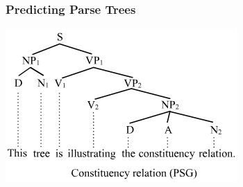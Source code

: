 \documentclass[final,ignorenonframetext,compress]{beamer}
\begin{document}
\begin{frame}
    \frametitle{Predicting Parse Trees}
    \begin{center}
        \includegraphics[width=.8\linewidth]{images/parse_tree_white_bg}
    \end{center}
\end{frame}
\end{document}
